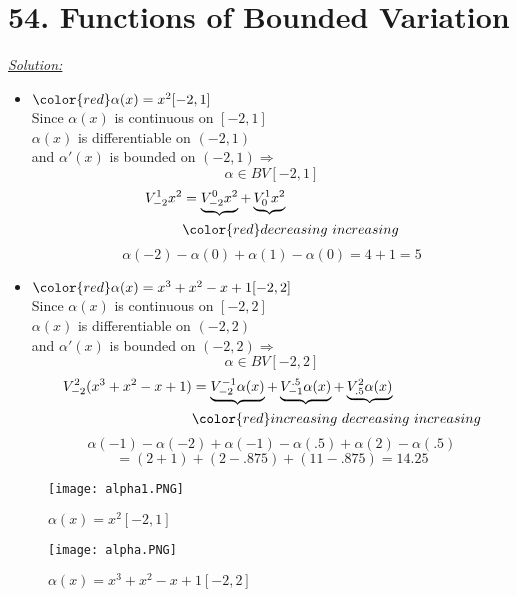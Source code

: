 \documentclass{book}
\begin{document}
\section{54. Functions of Bounded Variation}
\begin{tcolorbox}[enhanced,attach boxed title to top center={yshift=-3mm,yshifttext=-1mm},
colback=blue!5!white,colframe=blue!75!black,colbacktitle=red!80!black,
title=Exercise 54.1:,fonttitle=\bfseries,
boxed title style={size=small,colframe=red!50!black} ]
\textit{\color{blue}\underline{Solution:}}
\begin{itemize}
\item ${\color{red}\alpha(x)=x^2[-2,1]}$\\
Since $\alpha(x)$ is continuous on $[-2,1]$\\
$\alpha(x)$ is differentiable on $(-2,1)$\\
and $\alpha'(x)$ is bounded on $(-2,1)\Rightarrow$
$$\alpha\in BV[-2,1]$$
\begin{equation*} \label{equation1}
\begin{split}
V_{-2}^1 x^2& =\underbrace{V_{-2}^0 x^2} + \underbrace{V_0^1 x^2}\\
& {\color{red}decreasing~increasing}
\end{split}
\end{equation*}
$$\alpha(-2)-\alpha(0)+\alpha(1)-\alpha(0)=4+1=5$$
\noindent{\color{blue}\rule{\linewidth}{.3mm}}
\item ${\color{red}\alpha(x)=x^3+x^2-x+1[-2,2]}$\\
Since $\alpha(x)$ is continuous on $[-2,2]$\\
$\alpha(x)$ is differentiable on $(-2,2)$\\
and $\alpha'(x)$ is bounded on $(-2,2)\Rightarrow$
$$\alpha\in BV[-2,2]$$
\begin{equation*} \label{equation1}
\begin{split}
V_{-2}^2 (x^3+x^2-x+1) & =\underbrace{V_{-2}^{-1}\alpha(x)} + \underbrace{V_{-1}^{.5}\alpha(x)}+\underbrace{V_{.5}^2\alpha(x)}\\
& {\color{red}increasing~decreasing~increasing}
\end{split}
\end{equation*}
$$\alpha(-1)-\alpha(-2)+\alpha(-1)-\alpha(.5)+\alpha(2)-\alpha(.5)$$
$$=(2+1)+(2-.875)+(11-.875)=14.25$$
\end{itemize}

\end{tcolorbox}
\begin{figure} 
\centering
\texttt{[image: alpha1.PNG]}
\caption{$\alpha(x)=x^2[-2,1]$}
\end{figure}
\begin{figure}
\centering
\texttt{[image: alpha.PNG]}
\caption{$\alpha(x)=x^3+x^2-x+1[-2,2]$}
\end{figure}
\end{document}
